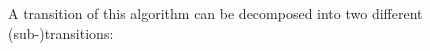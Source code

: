 \documentclass[english,graybox,envcountchap,envcountsame,sectrefs,shortlabels]{svmono}
\theoremstyle{style}
\newcommand{\gauss}{\mathcal{N}}
\begin{document}
%
%
A transition of this algorithm can be decomposed into two different (sub-)transitions:
\end{document}

